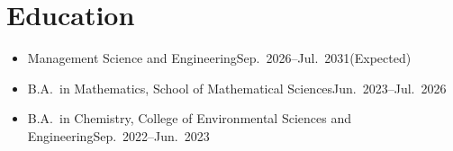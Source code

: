 \section{Education}
\begin{itemize}
	\item {}
	      {Management Science and Engineering}{Sep.\ 2026--Jul.\ 2031(Expected)}
	\item {}
	      {B.A.\ in Mathematics, School of Mathematical Sciences}{Jun.\ 2023--Jul.\ 2026}
	\item {}
	      {B.A.\ in Chemistry, College of Environmental Sciences and Engineering}{Sep.\ 2022--Jun.\ 2023}
\end{itemize}